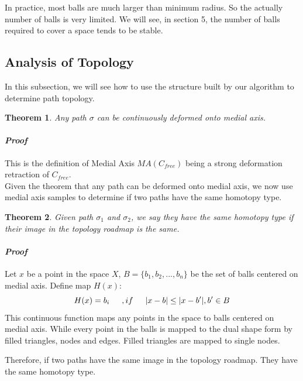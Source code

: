 \documentclass[11pt]{article}
\newtheorem{theorem}{Theorem}[section]
\begin{document}
  In practice, most balls are much larger than minimum radius. So the actually number of balls is very limited. We will see, in section 5, the number of balls required to cover a space tends to be stable. 
  
  \subsection{Analysis of Topology}
  
  In this subsection, we will see how to use the structure built by our algorithm to determine path topology.  
      
  \begin{theorem}
  Any path $\sigma$ can be continuously deformed onto medial axis. 
  \end{theorem}   
  \paragraph{\emph{Proof}}
  \indent This is the definition of Medial Axis $MA(C_{free})$ being a strong deformation retraction of $C_{free}$.\\
  
  Given the theorem that any path can be deformed onto medial axis, we now use medial axis samples to determine if two paths have the same homotopy type.
  
  \begin{theorem}
  Given path $\sigma_1$ and $\sigma_2$, we say they have the same homotopy type if their image in the topology roadmap is the same. 
  \end{theorem}
  \paragraph{\emph{Proof}}
  \indent Let $x$ be a point in the space $X$, $B = \{ b_1, b_2, ..., b_n \}$ be the set of balls centered on medial axis. Define map $H(x)$:
  \begin{equation}
  H(x) = b_i \indent, if \indent |x-b| \leq |x-b'|, b' \in B
  \end{equation}
  \indent This continuous function maps any points in the space to balls centered on medial axis. While every point in the balls is mapped to the dual shape form by filled triangles, nodes and edges. Filled triangles are mapped to single nodes.   
  
  \indent Therefore, if two paths have the same image in the topology roadmap. They have the same homotopy type.
\end{document}
